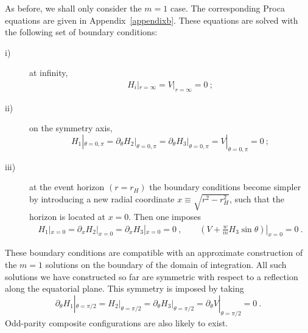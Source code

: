 As before, we shall only consider the $m=1$ case. The corresponding Proca equations are given in Appendix~\ref{appendixb}.
These equations are solved with the following set of boundary conditions:
\begin{description}
%
\item[i)] at infinity, 
\begin{eqnarray}
  H_i|_{r=\infty}=V|_{r=\infty}=0\ ;
  \label{bccloudslarge}
\end{eqnarray}
\item[ii)] on the symmetry axis, 
%
\begin{equation}
H_1|_{\theta=0,\pi}
 = \partial_\theta H_2\big|_{\theta=0,\pi}=\partial_\theta H_3\big|_{\theta=0,\pi}=V|_{\theta=0,\pi}=0 \ ;
 \label{bccloudsaxis}
\end{equation}
\item[iii)] at the event horizon $(r=r_H)$ the boundary conditions become simpler by introducing a new radial coordinate $x\equiv \sqrt{r^2-r_H^2}$, such that the horizon is located at $x=0$.
Then one imposes
\begin{eqnarray}
 H_1|_{x=0}=\partial_x H_2|_{x=0}=\partial_x H_3|_{x=0}= 0 \ , \qquad  \left(V+\frac{w}{m}H_3\sin\theta\right)|_{x=0}=0  
\label{bccloudshorizon} \ . 
\end{eqnarray}
\end{description}
%
These boundary conditions are compatible with an approximate construction of the $m=1$ solutions
on the boundary of the domain of integration. 
%
All such solutions we have constructed so far are symmetric with respect to a reflection along the equatorial plane. This symmetry is imposed by taking
 \begin{equation}
 \partial_\theta H_1|_{\theta=\pi/2}=
  H_2\big|_{\theta=\pi/2}=\partial_\theta H_3\big|_{\theta=\pi/2}= \partial_\theta  V|_{\theta=\pi/2}=0\ .
\end{equation}
Odd-parity composite configurations are also likely to exist.
 
